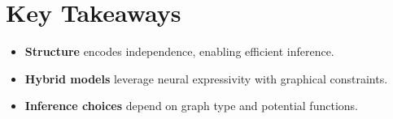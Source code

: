 
\section*{Key Takeaways}

\begin{itemize}[leftmargin=2em]
    \item \textbf{Structure} encodes independence, enabling efficient inference.
    \item \textbf{Hybrid models} leverage neural expressivity with graphical constraints.
    \item \textbf{Inference choices} depend on graph type and potential functions.
\end{itemize}


